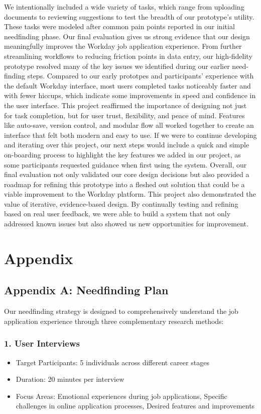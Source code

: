 \documentclass[
	letterpaper, %
]{jdf}
\begin{document}
\begin{sloppypar}
We intentionally included a wide variety of tasks, which range from uploading documents to reviewing suggestions to test the breadth of our prototype's utility. These tasks were modeled after common pain points reported in our initial needfinding phase. Our final evaluation gives us strong evidence that our design meaningfully improves the Workday job application experience. From further streamlining workflows to reducing friction points in data entry, our high-fidelity prototype resolved many of the key issues we identified during our earlier need-finding steps. Compared to our early prototpes and participants' experience with the default Workday interface, most users completed tasks noticeably faster and with fewer hiccups, which indicate some improvements in speed and confidence in the user interface. This project reaffirmed the importance of designing not just for task completion, but for user trust, flexibility, and peace of mind. Features like auto-save, version control, and modular flow all worked together to create an interface that felt both modern and easy to use. If we were to continue developing and iterating over this project, our next steps would include a quick and simple on-boarding process to highlight the key features we added in our project, as some participants requested guidance when first using the system. Overall, our final evaluation not only validated our core design decisions but also provided a roadmap for refining this prototype into a fleshed out solution that could be a viable improvement to the Workday platform. This project also demonstrated the value of iterative, evidence-based design. By continually testing and refining based on real user feedback, we were able to build a system that not only addressed known issues but also showed us new opportunities for improvement. 

\newpage




\section{Appendix}
\subsection{Appendix A: Needfinding Plan}

Our needfinding strategy is designed to comprehensively understand the job application experience through three complementary research methods:

\subsubsection{1. User Interviews}
\begin{itemize}
\item Target Participants: 5 individuals across different career stages
\item Duration: 20 minutes per interview
\item Focus Areas: Emotional experiences during job applications, Specific challenges in online application processes, Desired features and improvements
\end{itemize}
\hfill \break


\end{sloppypar}
\end{document}
